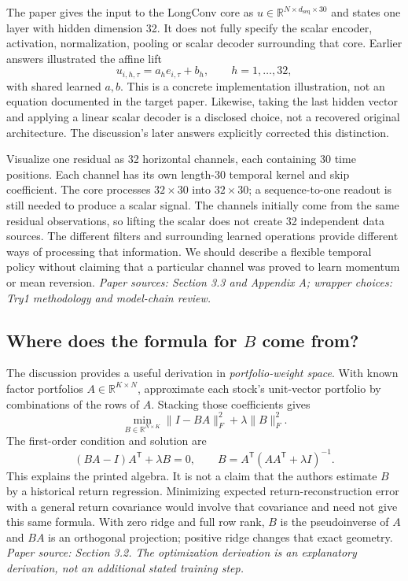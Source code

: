 \documentclass[11pt]{article}
\begin{document}
The paper gives the input to the LongConv core as
$u\in\mathbb{R}^{N\times d_{\mathrm{seq}}\times30}$ and states one layer
with hidden dimension 32. It does not fully specify the scalar encoder,
activation, normalization, pooling or scalar decoder surrounding that
core. Earlier answers illustrated the affine lift
\[
u_{i,h,\tau}=a_h e_{i,\tau}+b_h,
\qquad h=1,\ldots,32,
\]
with shared learned $a,b$. This is a concrete implementation illustration,
not an equation documented in the target paper. Likewise, taking the last
hidden vector and applying a linear scalar decoder is a disclosed choice,
not a recovered original architecture. The discussion's later answers
explicitly corrected this distinction.

Visualize one residual as 32 horizontal channels, each containing 30
time positions. Each channel has its own length-30 temporal kernel and
skip coefficient. The core processes $32\times30$ into $32\times30$;
a sequence-to-one readout is still needed to produce a scalar signal.
The channels initially come from the same residual observations, so
lifting the scalar does not create 32 independent data sources. The
different filters and surrounding learned operations provide different
ways of processing that information. We should describe a flexible
temporal policy without claiming that a particular channel was proved
to learn momentum or mean reversion.
\emph{Paper sources: Section 3.3 and Appendix A; wrapper choices:
Try1 methodology and model-chain review.}

\subsection{Where does the formula for \texorpdfstring{$B$}{B} come from?}

The discussion provides a useful derivation in \emph{portfolio-weight
space}. With known factor portfolios $A\in\mathbb{R}^{K\times N}$,
approximate each stock's unit-vector portfolio by combinations of the
rows of $A$. Stacking those coefficients gives
\[
\min_{B\in\mathbb{R}^{N\times K}}
\lVert I-BA\rVert_F^2+\lambda\lVert B\rVert_F^2.
\]
The first-order condition and solution are
\[
(BA-I)A^{\mathsf T}+\lambda B=0,
\qquad
B=A^{\mathsf T}(AA^{\mathsf T}+\lambda I)^{-1}.
\]
This explains the printed algebra. It is not a claim that the authors
estimate $B$ by a historical return regression. Minimizing expected
return-reconstruction error with a general return covariance would
involve that covariance and need not give this same formula. With zero
ridge and full row rank, $B$ is the pseudoinverse of $A$ and $BA$ is an
orthogonal projection; positive ridge changes that exact geometry.
\emph{Paper source: Section 3.2. The optimization derivation is an
explanatory derivation, not an additional stated training step.}
\end{document}
